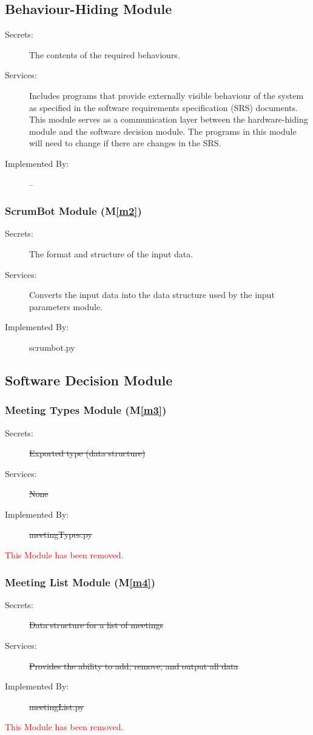 \documentclass[12pt, titlepage]{article}
\newcommand{\mref}[1]{M\ref{#1}}
\begin{document}
\subsection{Behaviour-Hiding Module}

\begin{description}
\item[Secrets:] The contents of the required behaviours.
\item[Services:] Includes programs that provide externally visible behaviour of
  the system as specified in the software requirements specification (SRS)
  documents. This module serves as a communication layer between the
  hardware-hiding module and the software decision module. The programs in this
  module will need to change if there are changes in the SRS.
\item[Implemented By:] --
\end{description}

\subsubsection{ScrumBot Module (\mref{m2})}
\begin{description}
    \item[Secrets:] The format and structure of the input data.
    \item[Services:] Converts the input data into the data structure used by the input parameters module.
    \item[Implemented By:] scrumbot.py
\end{description}

\subsection{Software Decision Module}
\subsubsection{Meeting Types Module (\mref{m3})}
\begin{description}
    \item[Secrets:] \sout{Exported type (data structure)}
    \item[Services:] \sout{None}
    \item[Implemented By:] \sout{meetingTypes.py}
\end{description}
\textcolor{red}{This Module has been removed.}

\subsubsection{Meeting List Module (\mref{m4})}
\begin{description}
    \item[Secrets:] \sout{Data structure for a list of meetings}
    \item[Services:] \sout{Provides the ability to add, remove, and output all data}
    \item[Implemented By:] \sout{meetingList.py}
\end{description}
\textcolor{red}{This Module has been removed.}
\end{document}

